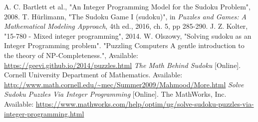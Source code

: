 \documentclass[12pt]{article}
\begin{document}
\begin{thebibliography}{1}
A. C. Bartlett et al., "An Integer Programming Model for the Sudoku Problem", 2008.
T. Hürlimann, "The Sudoku Game I (sudoku)", in \emph{Puzzles and Games: A Mathematical Modeling Approach}, 4th ed., 2016, ch. 5, pp 285-290.
J. Z. Kolter, "15-780 - Mixed integer programming", 2014.
W. Olszowy, "Solving sudoku as an Integer Programming problem".
"Puzzling Computers A gentle introduction to the theory of NP-Completeness.", Available: \url{https://geevi.github.io/2014/puzzles.html}
\emph{The Math Behind Sudoku} [Online].  Cornell University Department of Mathematics.  Available: \url{http://www.math.cornell.edu/~mec/Summer2009/Mahmood/More.html}
\emph{Solve Sudoku Puzzles Via Integer Programming} [Online]. The MathWorks, Inc. Available: \url{https://www.mathworks.com/help/optim/ug/solve-sudoku-puzzles-via-integer-programming.html}
\end{thebibliography}
\end{document}

